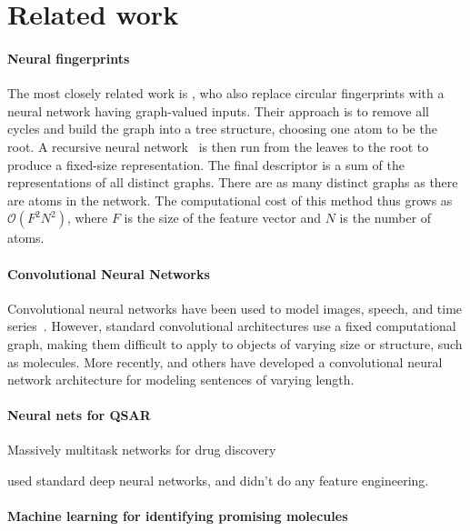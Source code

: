 \documentclass{article}
\begin{document}
\section{Related work}

\paragraph{Neural fingerprints}
The most closely related work is \citet{lusci2013deep}, who also replace circular fingerprints with a neural network having graph-valued inputs.
Their approach is to remove all cycles and build the graph into a tree structure, choosing one atom to be the root.
A recursive neural network~\citep{socher2011dynamic, socher2011semi} is then run from the leaves to the root to produce a fixed-size representation.
The final descriptor is a sum of the representations of all distinct graphs.
There are as many distinct graphs as there are atoms in the network.
The computational cost of this method thus grows as $\mathcal{O}(F^2N^2)$, where $F$ is the size of the feature vector and $N$ is the number of atoms.


\paragraph{Convolutional Neural Networks}

Convolutional neural networks have been used to model images, speech, and time series~\cite{lecun1995convolutional}.
However, standard convolutional architectures use a fixed computational graph, making them difficult to apply to objects of varying size or structure, such as molecules.
More recently, \cite{KalchbrennerACL2014} and others have developed a convolutional neural network architecture for modeling sentences of varying length.


\paragraph{Neural nets for QSAR}

\cite{ramsundar2015massively} Massively multitask networks for drug discovery

\cite{dahl2014multi, ma_qsar_2015} used standard deep neural networks, and didn't do any feature engineering.

\paragraph{Machine learning for identifying promising molecules}
\end{document}

